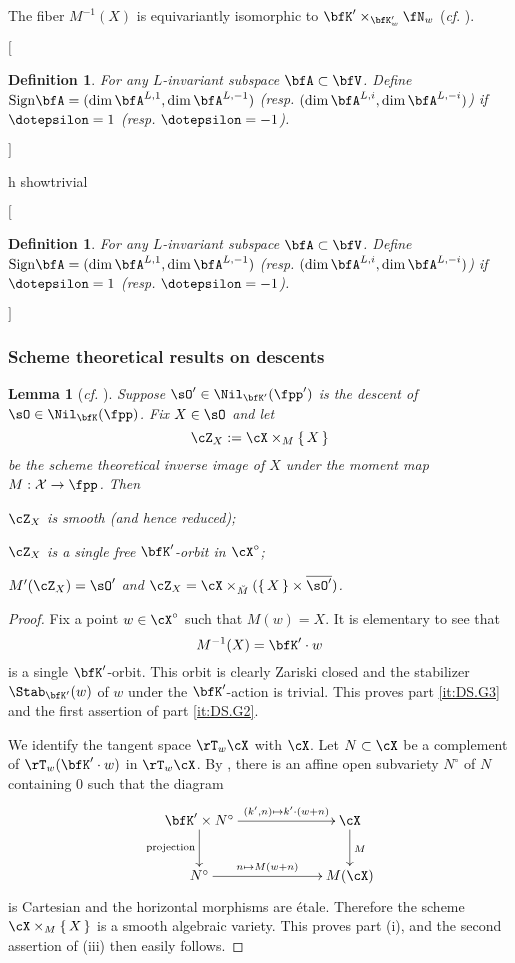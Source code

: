 \documentclass[12pt,a4paper]{amsart}
\makeatletter
\newcommand*{\circnuma}[1]{%
  \ifnum#1<1 %
    \@ctrerr
  \else
    \ifnum#1>20 %
      \@ctrerr
    \else
      \mbox{\ding{\numexpr 171+(#1)\relax}}%
     \fi
  \fi
}
\newcommand{\trivial}[2][]{\if\relax\detokenize{#1}\relax
  {%
      \color{orange} \vspace{0em} $[$  #2 $]$
      \color{black}
  }
  \else
\ifx#1h
\ifcsname showtrivial\endcsname
{%
    \color{orange} \vspace{0em}  $[$ #2 $]$
    \color{black}
}
\fi
\else {\red Wrong argument!} \fi
\fi
}
\newcommand{\CX}{{\mathcal {X}}}
\numberwithin{equation}{section}
\newtheorem{lem}[thm]{Lemma}
\newtheorem{defn}[thm]{Definition}
\theoremstyle{remark}
\def\MMP{M}
\def\Xo{\cX^\circ}
\def\ssign{\mathrm{Sign}}
\def\ZX{\cZ_{X}}
\def\bsOp{\overline{\sO'}}
\def\cf{\emph{cf.} }
\makeatother
\begin{document}
{  The fiber $M^{-1}(X)$ is equivariantly isomorphic to
  $\bfK'\times_{\bfK'_w}\fN_w$ (\emph{cf}.  \cite[Theorem~6.6]{PV}).


\trivial[]{
  \medskip


\begin{defn}
  For any $L$-invariant subspace $\bfA \subset \bfV$.  Define
  $\ssign\bfA = (\dim \bfA^{L,1}, \dim \bfA^{L,-1})$ (resp.
$(\dim \bfA^{L,i}, \dim \bfA^{L,-i})$) if $\dotepsilon=1$ (resp.
$\dotepsilon = -1$).
\end{defn}
}
}


\subsubsection{Scheme theoretical results on descents}\label{sec:Sdes}


\begin{lem}[{\cf \cite[Lemma~13 and Lemma 14]{Ohta}}]\label{lem:DS.sh}
Suppose $\sO'\in \Nil_{\bfK'}(\fpp')$ is the descent of $\sO\in \Nil_\bfK(\fpp)$.
Fix $X\in \sO$ and
let
\[
\ZX := \cX\times_{M}\set{X}
\]
be the scheme theoretical
inverse image of $X$ under the moment map $M: \CX\rightarrow \fpp$. Then
\begin{enumT}
\item\label{it:DS.G1} $\ZX$ is smooth (and hence reduced);
\item\label{it:DS.G3}   $\ZX$ is
  a single free $\bfK'$-orbit in $\Xo$;
\item\label{it:DS.G2}$M'(\ZX) = \sO'$ and $\ZX = \cX\times_{\dbM}( \set{X} \times\bsOp)$.
\end{enumT}
\end{lem}
 \begin{proof}
  Fix a point  $w\in \cX^\circ$ such that $M(w)=X$. It is elementary to see that
  \[
  M^{-1}(X)=\bfK'\cdot w
  \]
  is a single $\bfK'$-orbit. This orbit is clearly Zariski closed and the
  stabilizer $\Stab_{\bfK'}(w)$ of $w$ under the $\bfK'$-action is trivial. This
  proves part \cref{it:DS.G3} and the first assertion of part \cref{it:DS.G2}.

  We identify the tangent space $\rT_w\cX$ with $\cX$.  Let $N\subset \cX$
be a complement of $\rT_w (\bfK'\cdot w)$ in $\rT_w \cX$.
By \cite[Section~6.3]{PV}, there is an affine open subvariety $N^\circ$ of $N$ containing $0$ such that  the diagram
\[%
    \xymatrix@C=6em{
      \bfK' \times N^\circ \ar[r]^<>(.5){(k',n)\mapsto k'\cdot (w+n)} \ar[d]_<>(.5){\text{projection}}& \cX \ar[d]^{\MMP}\\
    N^\circ \ar[r]^<>(.5){n\mapsto M(w+n)}&  \MMP(\cX)
     }
\]
is  Cartesian and the
horizontal morphisms are \'etale. Therefore the scheme $\cX\times_M\set{X}$ is a smooth algebraic variety. This proves part (i), and the second assertion of (iii) then easily follows.
\end{proof}
\end{document}
